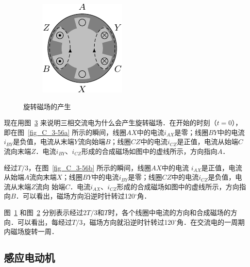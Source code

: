 \begin{figure}[htbp]
\begin{subfigure}{0.23\linewidth}
        \caption{}\label{fig_C_3-56c}
    \end{subfigure}
    \hfil
    \begin{subfigure}{0.23\linewidth}
        \centering
        \includegraphics{fig/C/3-56d.pdf}
        \caption{}\label{fig_C_3-56d}
    \end{subfigure}
    \caption{旋转磁场的产生}\label{fig_C_3-56}
\end{figure}

现在用图~\ref{fig_C_3-56} 来说明三相交流电为什么会产生旋转磁场．在开始的时刻（$t=0$），即在图~\ref{fig_C_3-56a} 所示的瞬间，线圈$AX$中的电流$i_{AX}$是零；线圈$BY$中的电流$i_{BY}$是负值，电流从末端$Y$流向始端$B$；线圈$CZ$中的电流$i_{CZ}$是正值，电流从始端$C$流向末端$Z$．电流$i_{BY}$、$i_{CZ}$形成的合成磁场如图中的虚线所示，方向指向$A$．

经过$T/3$，在图~\ref{fig_C_3-56b} 所示的瞬间，线圈$AX$中的电流
$i_{AX}$是正值，电流从始端$A$流向末端$X$；线圈$BY$中的电流$i_{BY}$是零；线圈$CZ$中的电流$i_{CZ}$是负值，电流从末端$Z$流向
始端$C$．电流$i_{AX}$、$i_{CZ}$形成的合成磁场如图中的虚线所示，方向指向$B$．可以看出，磁场方向沿逆时针转过120$^\circ$角．

图~\ref{fig_C_3-56c} 和图~\ref{fig_C_3-56d} 分别表示经过$2T/3$和$T$时，各个线圈中电流的方向和合成磁场的方向．可以看出，每经过$T/3$，磁场方向就沿逆时针转过120$^\circ$角．在交流电的一周期内磁场旋转一周．

\subsection{感应电动机}

